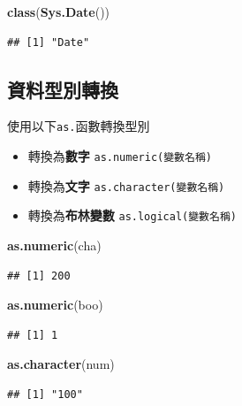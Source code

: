 \documentclass[]{book}
\newenvironment{Shaded}{\begin{snugshade}}{\end{snugshade}}
\newcommand{\KeywordTok}[1]{\textcolor[rgb]{0.13,0.29,0.53}{\textbf{{#1}}}}
\newcommand{\NormalTok}[1]{{#1}}
\providecommand{\tightlist}{%
  \setlength{\itemsep}{0pt}\setlength{\parskip}{0pt}}
\theoremstyle{definition}
\theoremstyle{definition}
\theoremstyle{remark}
\begin{document}
\begin{Shaded}
\begin{Highlighting}[]
\KeywordTok{class}\NormalTok{(}\KeywordTok{Sys.Date}\NormalTok{())}
\end{Highlighting}
\end{Shaded}

\begin{verbatim}
## [1] "Date"
\end{verbatim}

\subsection{資料型別轉換}

使用以下\texttt{as.}函數轉換型別

\begin{itemize}
\tightlist
\item
  轉換為\textbf{數字} \texttt{as.numeric(變數名稱)}
\item
  轉換為\textbf{文字} \texttt{as.character(變數名稱)}
\item
  轉換為\textbf{布林變數} \texttt{as.logical(變數名稱)}
\end{itemize}

\begin{Shaded}
\begin{Highlighting}[]
\KeywordTok{as.numeric}\NormalTok{(cha)}
\end{Highlighting}
\end{Shaded}

\begin{verbatim}
## [1] 200
\end{verbatim}

\begin{Shaded}
\begin{Highlighting}[]
\KeywordTok{as.numeric}\NormalTok{(boo)}
\end{Highlighting}
\end{Shaded}

\begin{verbatim}
## [1] 1
\end{verbatim}

\begin{Shaded}
\begin{Highlighting}[]
\KeywordTok{as.character}\NormalTok{(num)}
\end{Highlighting}
\end{Shaded}

\begin{verbatim}
## [1] "100"
\end{verbatim}
\end{document}
